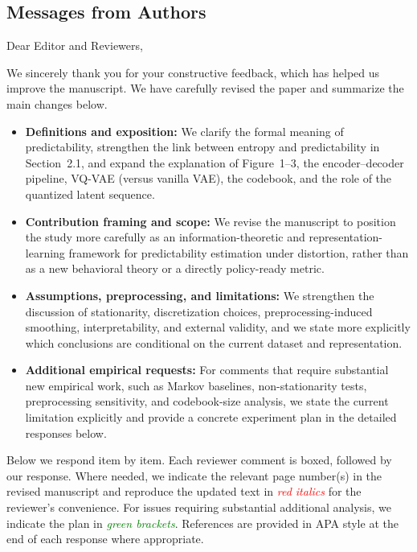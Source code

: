 \documentclass{NSF}
\begin{document}
\subsection{Messages from Authors}
\vskip 0.2in
\noindent Dear Editor and Reviewers,

\vskip 0.1in

\noindent We sincerely thank you for your constructive feedback, which has helped us improve the manuscript. We have carefully revised the paper and summarize the main changes below.

\begin{itemize}
    \item \textbf{Definitions and exposition:} We clarify the formal meaning of predictability, strengthen the link between entropy and predictability in Section~2.1, and expand the explanation of Figure~1--3, the encoder--decoder pipeline, VQ-VAE (versus vanilla VAE), the codebook, and the role of the quantized latent sequence.
    \item \textbf{Contribution framing and scope:} We revise the manuscript to position the study more carefully as an information-theoretic and representation-learning framework for predictability estimation under distortion, rather than as a new behavioral theory or a directly policy-ready metric.
    \item \textbf{Assumptions, preprocessing, and limitations:} We strengthen the discussion of stationarity, discretization choices, preprocessing-induced smoothing, interpretability, and external validity, and we state more explicitly which conclusions are conditional on the current dataset and representation.
    \item \textbf{Additional empirical requests:} For comments that require substantial new empirical work, such as Markov baselines, non-stationarity tests, preprocessing sensitivity, and codebook-size analysis, we state the current limitation explicitly and provide a concrete experiment plan in the detailed responses below.
\end{itemize}

\vskip 0.2in

\noindent Below we respond item by item. Each reviewer comment is boxed, followed by our response. Where needed, we indicate the relevant page number(s) in the revised manuscript and reproduce the updated text in \textcolor{red}{\textit{red italics}} for the reviewer’s convenience. For issues requiring substantial additional analysis, we indicate the plan in \textcolor{green}{\textit{green brackets}}. References are provided in APA style at the end of each response where appropriate.
\end{document}
